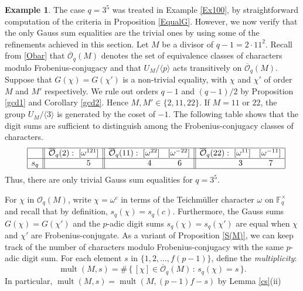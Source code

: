 \documentclass[12pt]{amsart}  \usepackage{amsmath,amssymb,enumerate,amscd,tikz,url}
\numberwithin{equation}{section}
\theoremstyle{definition}
\newtheorem{Ex}[equation]{Example}
\newcommand{\F}{{\mathbb F}}
\newcommand{\cO}{{\mathcal O}}
\newcommand{\mult}{\operatorname{mult}}
\newcommand{\lr}[1]{{\langle {#1} \rangle}}
\newcommand{\ov}[1]{\overline{#1}}
\begin{document}
\begin{Ex} \label{Ex200}
The case $q = 3^5$  was treated in Example \ref{Ex100}, by straightforward computation of the criteria in Proposition \ref{EqualG}.  However, we now verify that the only Gauss sum equalities are the trivial ones by using some of the refinements achieved in this section.   Let $M$ be a divisor of $q-1 =  2 \cdot 11^2$.  Recall from \eqref{Obar} that $\ov{\cO}_q(M)$ denotes the set of equivalence classes of characters modulo Frobenius-conjugacy and that $U_M/\lr{p}$ acts transitively on $\ov{\cO}_q(M)$.  Suppose that $G(\chi) = G(\chi')$ is a non-trivial equality, with $\chi$ and $\chi'$ of order $M$ and $M'$ respectively.  We rule out orders $q-1$ and $(q-1)/2$ by Proposition \ref{gcd1} and Corollary \ref{gcd2}. Hence $M,M' \in \{2,11,22\}$.  If $M  =  11$ or $22$, the group $U_{M}/\lr{3}$ is generated by the coset of $-1$.  The following table shows that the digit sums are sufficient to distinguish among the Frobenius-conjugacy classes of characters.   \vspace{5 pt}
$$
\quad  \begin{array}{ | c || r  || r r || r r | }
\hline
&\ov{\cO}_q(2):   \hspace{3 pt}  [\omega^{121}]  &  \ov{\cO}_q(11):    \hspace{3 pt}  [\omega^{22}] & [\omega^{-22}] &  \ov{\cO}_q(22):   \hspace{3 pt}  [\omega^{11}] & [\omega^{-11}] \\
\hline
s_q  & 5 \quad & 4 \quad & 6 \quad &  3 \quad & 7 \quad \\
\hline
 \end{array}
 $$
Thus, there are only trivial Gauss sum equalities for $q = 3^5$.
\end{Ex}


\vspace{5 pt}

For $\chi$ in $\cO_q(M)$, write $\chi = \omega^c$ in terms of the Teichm\"{u}ller character $\omega$ on $\F_q^\times$ and recall that by definition, $s_q(\chi) = s_q(c)$. Furthermore, the Gauss sums $G(\chi) = G(\chi')$ and the $p$-adic digit sums $s_q(\chi) = s_q(\chi')$ are equal when $\chi$ and $\chi'$ are Frobenius-conjugate.   As a variant of Proposition \ref{S(M)}, we can keep track of the number of characters modulo Frobenius-conjugacy with the same $p$-adic digit sum.   For each element $s$ in $\{ 1, 2, ..., f(p-1) \}$, define the {\em multiplicity}:
$$
\mult(M,s) = \#\, \{ \, [\chi] \in \ov{\cO}_q(M) \, : \,  s_q(\chi) = s  \, \}.
$$ 
In particular, $\mult(M,s) = \mult(M,(p-1)f-s)$ by Lemma \ref{cs}(ii) 
\end{document}

